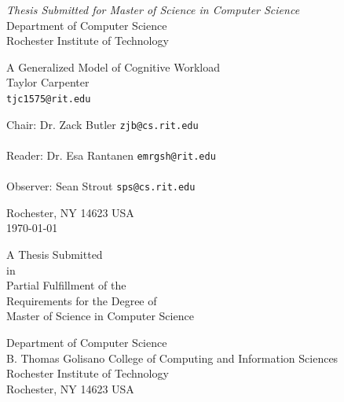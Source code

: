 \documentclass[11pt]{article}
\begin{document}
\thispagestyle{empty}
\begin{center}
\begin{Large}
\emph{Thesis Submitted for Master of Science in Computer Science} \\
Department of Computer Science \\
Rochester Institute of Technology \\
\end{Large}
\vspace{4em}
{\huge A Generalized Model of Cognitive Workload} \\
\vspace{3em}
{\LARGE Taylor Carpenter} \\
{\tt tjc1575@rit.edu} \\
\vspace{3em}
\begin{adjustwidth}{.5in}{.5in}
Chair: Dr. Zack Butler \hfill {\tt zjb@cs.rit.edu} \\
\vspace{2em}
\hrulefill \\
\vspace{3em}
Reader: Dr. Esa Rantanen \hfill {\tt emrgsh@rit.edu} \\
\vspace{2em}
\hrulefill \\
\vspace{3em}
Observer: Sean Strout \hfill {\tt sps@cs.rit.edu} \\
\vspace{2em}
\hrulefill
\end{adjustwidth}
\vspace{2em}
Rochester, NY 14623 USA \\
\vspace{2em}
\today
\end{center}
\pagebreak
\thispagestyle{empty}
\begin{center}
\begin{large}
A Thesis Submitted\\
in\\
Partial Fulfillment of the\\
Requirements for the Degree of\\
Master of Science in Computer Science

\vspace{.5in}

Department of Computer Science\\
B. Thomas Golisano College of Computing and Information Sciences\\
Rochester Institute of Technology\\
Rochester, NY 14623 USA
\end{large}
\end{center}
\pagebreak
\thispagestyle{empty}
\end{document}
